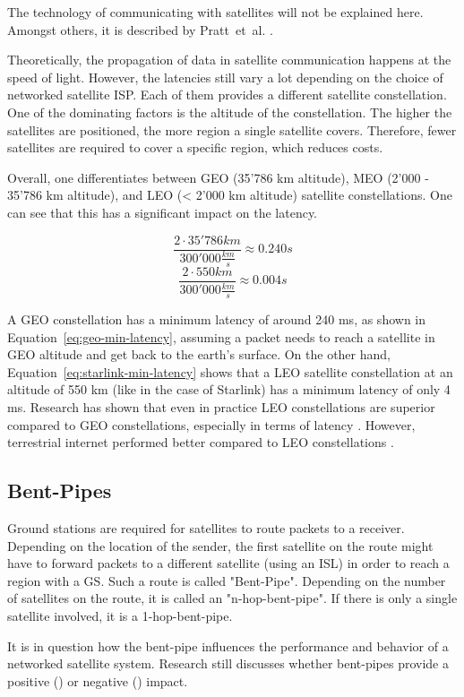 The technology of communicating with satellites will not be explained here.
Amongst others, it is described by Pratt~et~al. \cite{pratt2019satellite}.

Theoretically, the propagation of data in satellite communication happens at the speed of light.
However, the latencies still vary a lot depending on the choice of networked satellite ISP.
Each of them provides a different satellite constellation. One of the dominating factors is the
altitude of the constellation. The higher the satellites are positioned, the more region a single satellite covers.
Therefore, fewer satellites are required to cover a specific region, which reduces costs.

Overall, one differentiates between \ac{GEO} (35'786 km altitude), \ac{MEO} (2'000 - 35'786 km altitude), and \ac{LEO} (< 2'000 km altitude) satellite constellations.
One can see that this has a significant impact on the latency.

\begin{equation}
	\frac{2 \cdot 35'786 km}{300'000 \frac{km}{s}} \approx 0.240 s
	\label{eq:geo-min-latency}
\end{equation}
\begin{equation}
	\frac{2 \cdot 550 km}{300'000 \frac{km}{s}} \approx 0.004 s
	\label{eq:starlink-min-latency}
\end{equation}

A \ac{GEO} constellation has a minimum latency of around 240 ms, as shown in Equation~\ref{eq:geo-min-latency}, assuming a packet needs to reach a satellite in GEO altitude and get back to the earth's surface.
On the other hand, Equation~\ref{eq:starlink-min-latency} shows that a \ac{LEO} satellite constellation at an altitude of 550 km (like in the case of Starlink) has a minimum latency of only 4 ms.
Research has shown that even in practice \ac{LEO} constellations are superior compared to \ac{GEO} constellations, especially in terms of latency \cite{DBLP:journals/pacmnet/RamanVCSZ23, Segan2020}.
However, terrestrial internet performed better compared to \ac{LEO} constellations \cite{DBLP:conf/www/MohanFCBRMO24, DBLP:conf/infocom/MaCZCML23}.

\subsection{Bent-Pipes} \label{sec:bent-pipes}

Ground stations are required for satellites to route packets to a receiver. Depending on the location of the sender, the first satellite on the route might have to forward packets to a different satellite (using an \ac{ISL}) in order to reach a region with a \ac{GS}. Such a route is called "Bent-Pipe". Depending on the number of satellites on the route, it is called an "n-hop-bent-pipe". If there is only a single satellite involved, it is a 1-hop-bent-pipe.

It is in question how the bent-pipe influences the performance and behavior of a networked satellite system. Research still discusses whether bent-pipes provide a positive (\cite{Hauri2020}) or negative (\cite{DBLP:conf/www/MohanFCBRMO24}) impact.

